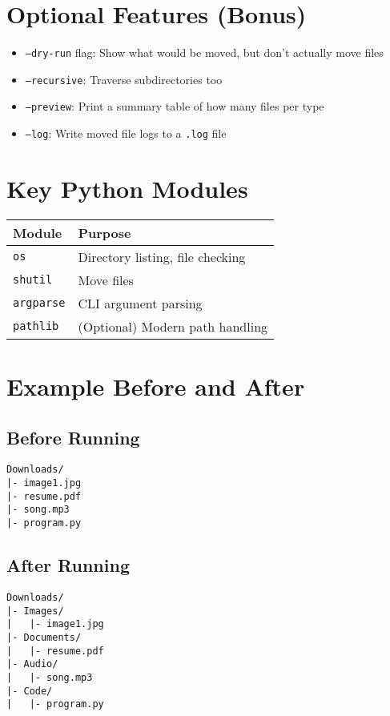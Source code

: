 \documentclass[14pt]{extarticle}
\begin{document}
\section*{Optional Features (Bonus)}
\begin{itemize}
    \item \texttt{--dry-run} flag: Show what would be moved, but don’t actually move files
    \item \texttt{--recursive}: Traverse subdirectories too
    \item \texttt{--preview}: Print a summary table of how many files per type
    \item \texttt{--log}: Write moved file logs to a \texttt{.log} file
\end{itemize}

\section*{Key Python Modules}
\begin{tabular}{ll}
\toprule
\textbf{Module} & \textbf{Purpose} \\
\midrule
\texttt{os} & Directory listing, file checking \\
\texttt{shutil} & Move files \\
\texttt{argparse} & CLI argument parsing \\
\texttt{pathlib} & (Optional) Modern path handling \\
\bottomrule
\end{tabular}

\section*{Example Before and After}

\subsection*{Before Running}
\begin{lstlisting}
Downloads/
|- image1.jpg
|- resume.pdf
|- song.mp3
|- program.py
\end{lstlisting}

\subsection*{After Running}
\begin{lstlisting}
Downloads/
|- Images/
|   |- image1.jpg
|- Documents/
|   |- resume.pdf
|- Audio/
|   |- song.mp3
|- Code/
|   |- program.py
\end{lstlisting}
\end{document}
